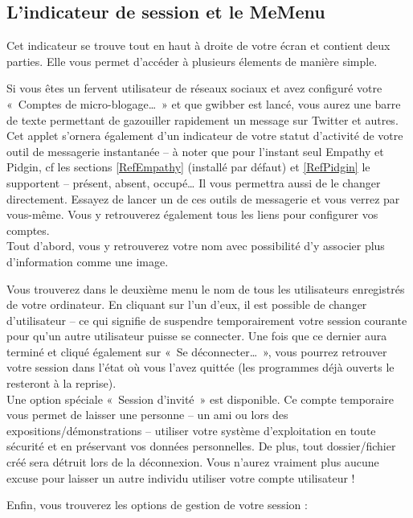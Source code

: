 \subsection{L'indicateur de session et le MeMenu}
\label{RefSwitchUser}
Cet indicateur se trouve tout en haut à droite de votre écran et contient deux parties. Elle vous permet d'accéder à plusieurs élements de manière simple.\par
Si vous êtes un fervent utilisateur de réseaux sociaux et avez configuré votre «~Comptes de micro-blogage\ldots{}~» et que gwibber est lancé, vous aurez une barre de texte permettant de gazouiller rapidement un message sur Twitter et autres.\\
Cet applet s'ornera également d'un indicateur de votre statut d'activité de votre outil de messagerie instantanée -- à noter que pour l'instant seul Empathy et Pidgin, cf les sections \ref{RefEmpathy} (installé par défaut) et \ref{RefPidgin} le supportent -- présent, absent, occupé\ldots{} Il vous permettra aussi de le changer directement. Essayez de lancer un de ces outils de messagerie et vous verrez par vous-même. Vous y retrouverez également tous les liens pour configurer vos comptes.\\
Tout d'abord, vous y retrouverez votre nom avec possibilité d'y associer plus d'information comme une image.\par
Vous trouverez dans le deuxième menu le nom de tous les utilisateurs enregistrés de votre ordinateur. En cliquant sur l'un d'eux, il est possible de changer d'utilisateur -- ce qui signifie de suspendre temporairement votre session courante pour qu'un autre utilisateur puisse se connecter. Une fois que ce dernier aura terminé et cliqué également sur «~Se déconnecter\ldots{}~», vous pourrez retrouver votre session dans l'état où vous l'avez quittée (les programmes déjà ouverts le resteront à la reprise).\\
Une option spéciale «~Session d'invité~» est disponible. Ce compte temporaire vous permet de laisser une personne -- un ami ou lors des expositions/\IndicCesure{}démonstrations -- utiliser votre système d'exploitation en toute sécurité et en préservant vos données personnelles. De plus, tout dossier/fichier créé sera détruit lors de la déconnexion. Vous n'aurez vraiment plus aucune excuse pour laisser un autre individu utiliser votre compte utilisateur !\par
Enfin, vous trouverez les options de gestion de votre session :
